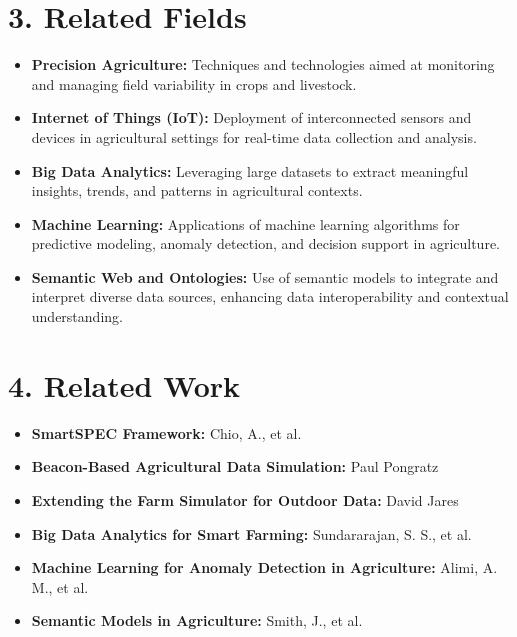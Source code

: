 \documentclass[11pt]{article}
\begin{document}
\section*{3. Related Fields}
\begin{itemize}
    \item \textbf{Precision Agriculture:} Techniques and technologies aimed at monitoring and managing field variability in crops and livestock.
    \item \textbf{Internet of Things (IoT):} Deployment of interconnected sensors and devices in agricultural settings for real-time data collection and analysis.
    \item \textbf{Big Data Analytics:} Leveraging large datasets to extract meaningful insights, trends, and patterns in agricultural contexts.
    \item \textbf{Machine Learning:} Applications of machine learning algorithms for predictive modeling, anomaly detection, and decision support in agriculture.
    \item \textbf{Semantic Web and Ontologies:} Use of semantic models to integrate and interpret diverse data sources, enhancing data interoperability and contextual understanding.
\end{itemize}

\section*{4. Related Work}
\begin{itemize}
    \item \textbf{SmartSPEC Framework:} Chio, A., et al.
    \item \textbf{Beacon-Based Agricultural Data Simulation:} Paul Pongratz
    \item \textbf{Extending the Farm Simulator for Outdoor Data:} David Jares
    \item \textbf{Big Data Analytics for Smart Farming:} Sundararajan, S. S., et al.
    \item \textbf{Machine Learning for Anomaly Detection in Agriculture:} Alimi, A. M., et al.
    \item \textbf{Semantic Models in Agriculture:} Smith, J., et al.
\end{itemize}
\end{document}
